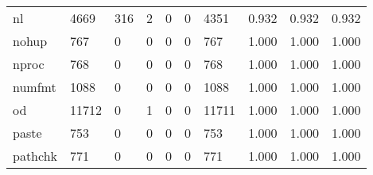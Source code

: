 \begin{longtable}{lp{2.0cm}p{2.0cm}p{2.0cm}p{2.0cm}p{2.0cm}p{2.0cm}p{2.0cm}p{2.0cm}p{2.0cm}}
nl        &                   4669 &                                316 &                                 2 &                                0 &                                 0 &                            4351 &                                0.932 &                                  0.932 &                                0.932 \\
nohup     &                    767 &                                  0 &                                 0 &                                0 &                                 0 &                             767 &                                1.000 &                                  1.000 &                                1.000 \\
nproc     &                    768 &                                  0 &                                 0 &                                0 &                                 0 &                             768 &                                1.000 &                                  1.000 &                                1.000 \\
numfmt    &                   1088 &                                  0 &                                 0 &                                0 &                                 0 &                            1088 &                                1.000 &                                  1.000 &                                1.000 \\
od        &                  11712 &                                  0 &                                 1 &                                0 &                                 0 &                           11711 &                                1.000 &                                  1.000 &                                1.000 \\
paste     &                    753 &                                  0 &                                 0 &                                0 &                                 0 &                             753 &                                1.000 &                                  1.000 &                                1.000 \\
pathchk   &                    771 &                                  0 &                                 0 &                                0 &                                 0 &                             771 &                                1.000 &                                  1.000 &                                1.000 \\

\end{longtable}
